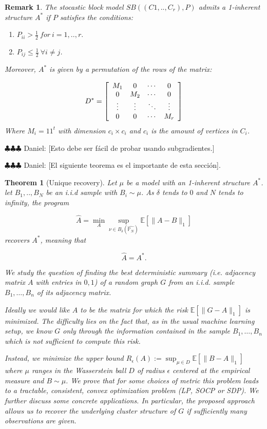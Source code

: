 \documentclass[12pt]{amsart}
\newtheorem{theorem}[lemma]{Theorem}
\newtheorem{remark}[lemma]{Remark}
\numberwithin{equation}{section}
\newcommand{\EE}{\mathbb{E}}
\newcommand{\ddr}[1]{{\color{blue} \sf $\clubsuit\clubsuit\clubsuit$ Daniel: [#1]}}
\begin{document}
\begin{remark}
The stocastic block model 
$SB((C1,..,C_r),P)$ admits a 1-inherent structure $A^*$ if $P$ satisfies the conditions:
\begin{enumerate}
\item $P_{ii}>\frac{1}{2} \ for \ i=1,..,r.$
\item $P_{ij} \leq \frac{1}{2} \  \forall  i \neq j$.
\end{enumerate}
Moreover, $A^*$ is given by a permutation of the rows of the matrix:

\[
D^* = 
\left[
\begin{array}{c c c c}
M_1 & 0 &\cdots & 0\\
0 & M_2 & \cdots & 0 \\ 
\vdots & \vdots & \ddots & \vdots \\
0 & 0& \cdots & M_r

\end{array}
\right] 
\]
Where  $M_i=11^t$ with dimension $c_i \times c_i$ and $c_i$ is the amount of vertices in $C_i$.
\end{remark}


\ddr{Esto debe ser f\'acil de probar usando subgradientes.}

\ddr{El siguiente teorema es el importante de esta secci\'on}.

\begin{theorem}[Unique recovery]
Let $\mu$ be a model with an 1-inherent structure $A^*$. let $B_1,..,B_N$ be an i.i.d sample with $B_i \sim \mu$.
As $\delta$ tends to $0$ and $N$ tends to infinity, the program 

\[
\hat{A}=\min_A\sup_{\nu\in B_{\delta}(\hat{\mathbb{P}_N})} \EE[\|A-B\|_1]
\]
recovers $A^*$, meaning that

\[
\hat{A}=A^*.
\]

We study the question of finding the best deterministic summary (i.e. adjacency matrix $A$ with entries in ${0,1}$) of a random graph $G$ from an i.i.d. sample $B_1,\dots, B_n$ of its adjacency matrix.

Ideally we would like $A$ to be the matrix for which the risk $\mathbb{E}[\|G-A\|_1]$ is minimized. The difficulty lies on the fact that, as in the usual machine learning setup, we know $G$ only through the information contained in the sample $B_1,\dots, B_n$ which is not sufficient to compute this risk. 

Instead, we minimize the upper bound $R_\epsilon(A):=\sup_{\mu\in D}\mathbb{E}[\|B-A\|_1]$ where $\mu$ ranges in the Wasserstein ball $D$ of radius $\epsilon$ centered at the empirical measure and $B \sim \mu$. We prove that for some choices of metric this problem leads to a tractable, consistent, convex optimization problem (LP, SOCP or SDP). We further discuss some concrete applications. In particular, the proposed approach allows us to recover the underlying cluster structure of $G$ if sufficiently many observations are given.

\end{theorem}
\end{document}
